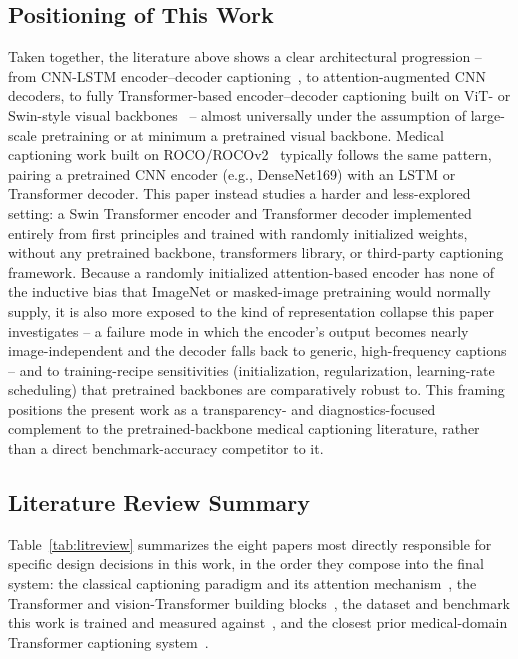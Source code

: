\documentclass[conference]{IEEEtran}
\begin{document}
\subsection{Positioning of This Work}
Taken together, the literature above shows a clear architectural progression -- from CNN-LSTM encoder--decoder captioning~\cite{vinyals2015show,xu2015show,ijraset2022}, to attention-augmented CNN decoders, to fully Transformer-based encoder--decoder captioning built on ViT- or Swin-style visual backbones~\cite{dosovitskiy2020vit,liu2021swin,lee2022cross,fadhilah2026transformer} -- almost universally under the assumption of large-scale pretraining or at minimum a pretrained visual backbone. Medical captioning work built on ROCO/ROCOv2~\cite{pelka2018roco,ruckert2024rocov2,ruckert2023imageclef} typically follows the same pattern, pairing a pretrained CNN encoder (e.g., DenseNet169) with an LSTM or Transformer decoder. This paper instead studies a harder and less-explored setting: a Swin Transformer encoder and Transformer decoder implemented entirely from first principles and trained with randomly initialized weights, without any pretrained backbone, transformers library, or third-party captioning framework. Because a randomly initialized attention-based encoder has none of the inductive bias that ImageNet or masked-image pretraining would normally supply, it is also more exposed to the kind of representation collapse this paper investigates -- a failure mode in which the encoder's output becomes nearly image-independent and the decoder falls back to generic, high-frequency captions -- and to training-recipe sensitivities (initialization, regularization, learning-rate scheduling) that pretrained backbones are comparatively robust to. This framing positions the present work as a transparency- and diagnostics-focused complement to the pretrained-backbone medical captioning literature, rather than a direct benchmark-accuracy competitor to it.

\subsection{Literature Review Summary}
\label{sec:related-summary}

Table~\ref{tab:litreview} summarizes the eight papers most directly responsible for specific design decisions in this work, in the order they compose into the final system: the classical captioning paradigm and its attention mechanism~\cite{vinyals2015show,xu2015show}, the Transformer and vision-Transformer building blocks~\cite{vaswani2017attention,dosovitskiy2020vit,liu2021swin}, the dataset and benchmark this work is trained and measured against~\cite{ruckert2024rocov2,ruckert2023imageclef}, and the closest prior medical-domain Transformer captioning system~\cite{lee2022cross}.
\end{document}
